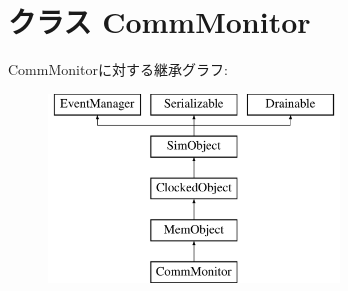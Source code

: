 \hypertarget{classCommMonitor_1_1CommMonitor}{
\section{クラス CommMonitor}
\label{classCommMonitor_1_1CommMonitor}
}
CommMonitorに対する継承グラフ:\begin{figure}[H]
\begin{center}
\leavevmode
\includegraphics[height=5cm]{classCommMonitor_1_1CommMonitor}
\end{center}
\end{figure}
